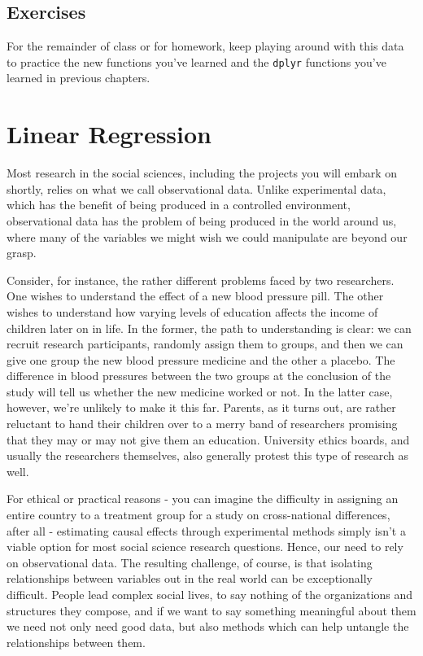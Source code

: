 \documentclass[
  letterpaper,
]{book}
\begin{document}
\hypertarget{exercises-1}{%
\section{Exercises}\label{exercises-1}}

For the remainder of class or for homework, keep playing around with
this data to practice the new functions you've learned and the
\texttt{dplyr} functions you've learned in previous chapters.


\hypertarget{linear-regression}{%
\chapter{Linear Regression}\label{linear-regression}}

Most research in the social sciences, including the projects you will
embark on shortly, relies on what we call observational data. Unlike
experimental data, which has the benefit of being produced in a
controlled environment, observational data has the problem of being
produced in the world around us, where many of the variables we might
wish we could manipulate are beyond our grasp.

Consider, for instance, the rather different problems faced by two
researchers. One wishes to understand the effect of a new blood pressure
pill. The other wishes to understand how varying levels of education
affects the income of children later on in life. In the former, the path
to understanding is clear: we can recruit research participants,
randomly assign them to groups, and then we can give one group the new
blood pressure medicine and the other a placebo. The difference in blood
pressures between the two groups at the conclusion of the study will
tell us whether the new medicine worked or not. In the latter case,
however, we're unlikely to make it this far. Parents, as it turns out,
are rather reluctant to hand their children over to a merry band of
researchers promising that they may or may not give them an education.
University ethics boards, and usually the researchers themselves, also
generally protest this type of research as well.

For ethical or practical reasons - you can imagine the difficulty in
assigning an entire country to a treatment group for a study on
cross-national differences, after all - estimating causal effects
through experimental methods simply isn't a viable option for most
social science research questions. Hence, our need to rely on
observational data. The resulting challenge, of course, is that
isolating relationships between variables out in the real world can be
exceptionally difficult. People lead complex social lives, to say
nothing of the organizations and structures they compose, and if we want
to say something meaningful about them we need not only need good data,
but also methods which can help untangle the relationships between them.
\end{document}
